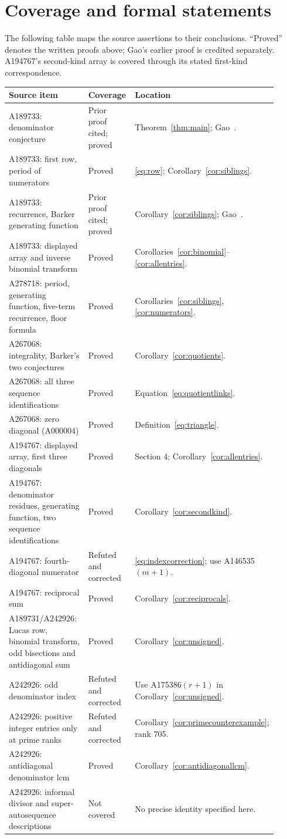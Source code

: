 \documentclass[11pt]{article}
\begin{document}
\section{Coverage and formal statements}
The following table maps the source assertions to their conclusions.
``Proved'' denotes the written proofs above; Gao's earlier proof is credited
separately. A194767's second-kind array is covered through its stated
first-kind correspondence.
\begingroup\small
\begin{longtable}{@{}p{0.38\linewidth}p{0.19\linewidth}p{0.34\linewidth}@{}}
\toprule
Source item & Coverage & Location\\
\midrule
\endhead
A189733: denominator conjecture & Prior proof cited; proved & Theorem~\ref{thm:main}; Gao~\cite{gao}.\\
A189733: first row, period of numerators & Proved & \eqref{eq:row}; Corollary~\ref{cor:siblings}.\\
A189733: recurrence, Barker generating function & Prior proof cited; proved & Corollary~\ref{cor:siblings}; Gao~\cite{gao}.\\
A189733: displayed array and inverse binomial transform & Proved & Corollaries~\ref{cor:binomial}--\ref{cor:allentries}.\\
A278718: period, generating function, five-term recurrence, floor formula & Proved & Corollaries~\ref{cor:siblings}, \ref{cor:numerators}.\\
A267068: integrality, Barker's two conjectures & Proved & Corollary~\ref{cor:quotients}.\\
A267068: all three sequence identifications & Proved & Equation~\eqref{eq:quotientlinks}.\\
A267068: zero diagonal (A000004) & Proved & Definition~\eqref{eq:triangle}.\\
A194767: displayed array, first three diagonals & Proved & Section 4; Corollary~\ref{cor:allentries}.\\
A194767: denominator residues, generating function, two sequence identifications & Proved & Corollary~\ref{cor:secondkind}.\\
A194767: fourth-diagonal numerator & Refuted and corrected & \eqref{eq:indexcorrection}; use A146535$(m+1)$.\\
A194767: reciprocal sum & Proved & Corollary~\ref{cor:reciprocals}.\\
A189731/A242926: Lucas row, binomial transform, odd bisections and antidiagonal sum & Proved & Corollary~\ref{cor:unsigned}.\\
A242926: odd denominator index & Refuted and corrected & Use A175386$(r+1)$ in Corollary~\ref{cor:unsigned}.\\
A242926: positive integer entries only at prime ranks & Refuted and corrected & Corollary~\ref{cor:primecounterexample}; rank 705.\\
A242926: antidiagonal denominator lcm & Proved & Corollary~\ref{cor:antidiagonallcm}.\\
A242926: informal divisor and super-autosequence descriptions & Not covered & No precise identity specified here.\\
\bottomrule
\end{longtable}
\end{document}
